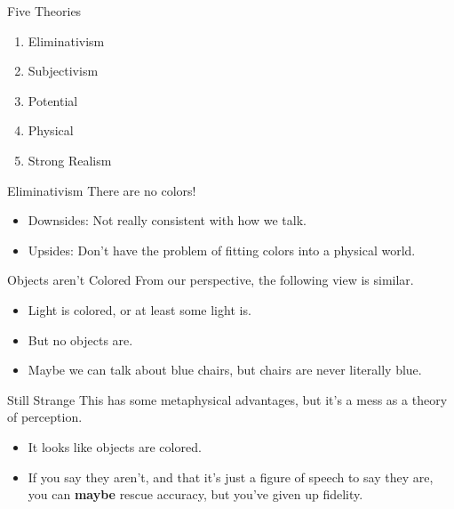 \documentclass[
  17pt,
  letterpaper,
  ignorenonframetext,
  aspectratio=169,
  handout]{beamer}
\providecommand{\tightlist}{%
  \setlength{\itemsep}{0pt}\setlength{\parskip}{0pt}}\usepackage{longtable,booktabs,array}
\begin{document}
\begin{frame}{Five Theories}
\protect\hypertarget{five-theories}{}
\begin{enumerate}[<+->]
\tightlist
\item
  Eliminativism
\item
  Subjectivism
\item
  Potential
\item
  Physical
\item
  Strong Realism
\end{enumerate}
\end{frame}

\begin{frame}{Eliminativism}
\protect\hypertarget{eliminativism}{}
There are no colors!

\begin{itemize}[<+->]
\tightlist
\item
  Downsides: Not really consistent with how we talk.
\item
  Upsides: Don't have the problem of fitting colors into a physical
  world.
\end{itemize}
\end{frame}

\begin{frame}{Objects aren't Colored}
\protect\hypertarget{objects-arent-colored}{}
From our perspective, the following view is similar.

\begin{itemize}[<+->]
\tightlist
\item
  Light is colored, or at least some light is.
\item
  But no objects are.
\item
  Maybe we can talk about blue chairs, but chairs are never literally
  blue.
\end{itemize}
\end{frame}

\begin{frame}{Still Strange}
\protect\hypertarget{still-strange}{}
This has some metaphysical advantages, but it's a mess as a theory of
perception.

\begin{itemize}[<+->]
\tightlist
\item
  It looks like objects are colored.
\item
  If you say they aren't, and that it's just a figure of speech to say
  they are, you can \textbf{maybe} rescue accuracy, but you've given up
  fidelity.
\end{itemize}
\end{frame}
\end{document}
